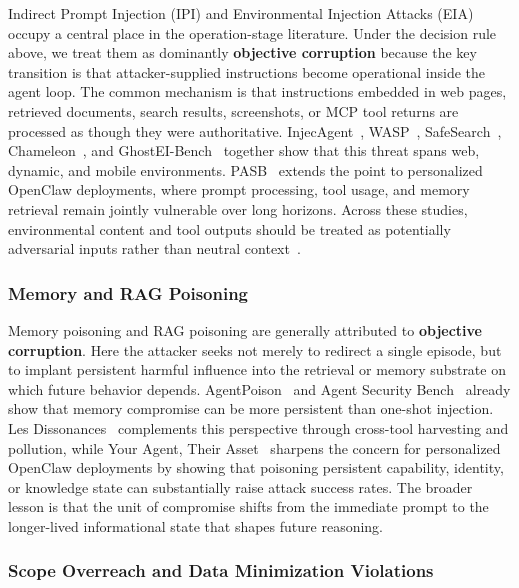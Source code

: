 Indirect Prompt Injection (IPI) and Environmental Injection Attacks (EIA) occupy a central place in the operation-stage literature. Under the decision rule above, we treat them as dominantly \textbf{objective corruption} because the key transition is that attacker-supplied instructions become operational inside the agent loop. The common mechanism is that instructions embedded in web pages, retrieved documents, search results, screenshots, or MCP tool returns are processed as though they were authoritative. InjecAgent~\cite{zhan2024injecagent}, WASP~\cite{evtimov2025wasp}, SafeSearch~\cite{dong2025safesearch}, Chameleon~\cite{zhang2026realistic}, and GhostEI-Bench~\cite{chen2025ghostei} together show that this threat spans web, dynamic, and mobile environments. PASB~\cite{wang2026pasb} extends the point to personalized OpenClaw deployments, where prompt processing, tool usage, and memory retrieval remain jointly vulnerable over long horizons. Across these studies, environmental content and tool outputs should be treated as potentially adversarial inputs rather than neutral context~\cite{zhang2025browsesafe}.

\subsubsection{Memory and RAG Poisoning}

Memory poisoning and RAG poisoning are generally attributed to \textbf{objective corruption}. Here the attacker seeks not merely to redirect a single episode, but to implant persistent harmful influence into the retrieval or memory substrate on which future behavior depends. AgentPoison~\cite{chen2024agentpoison} and Agent Security Bench~\cite{zhang2024agent} already show that memory compromise can be more persistent than one-shot injection. Les Dissonances~\cite{li2025dissonances} complements this perspective through cross-tool harvesting and pollution, while Your Agent, Their Asset~\cite{wang2026asset} sharpens the concern for personalized OpenClaw deployments by showing that poisoning persistent capability, identity, or knowledge state can substantially raise attack success rates. The broader lesson is that the unit of compromise shifts from the immediate prompt to the longer-lived informational state that shapes future reasoning.

\subsubsection{Scope Overreach and Data Minimization Violations}

